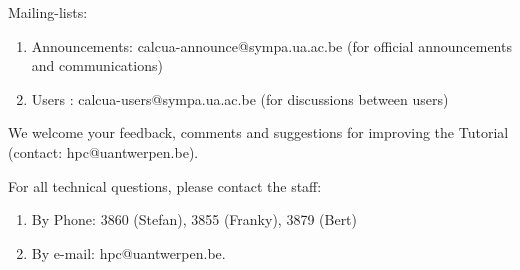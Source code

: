 Mailing-lists:

\begin{enumerate}
\item  Announcements: calcua-announce@sympa.ua.ac.be (for official announcements and communications)
\item  Users : calcua-users@sympa.ua.ac.be (for discussions between users)
\end{enumerate}


We welcome your feedback, comments and suggestions for improving the \hpc
Tutorial  (contact: hpc@uantwerpen.be).


For all technical questions, please contact the \hpc staff:

\begin{enumerate}
\item  By Phone: 3860 (Stefan), 3855 (Franky), 3879 (Bert)
\item  By e-mail:  hpc@uantwerpen.be.
\end{enumerate}
